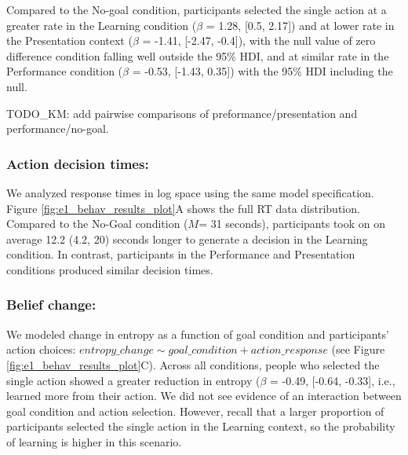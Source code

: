 \documentclass[10pt, letterpaper]{article}
\begin{document}
Compared to the No-goal condition, participants selected the single
action at a greater rate in the Learning condition (\(\beta\) = 1.28,
{[}0.5, 2.17{]}) and at lower rate in the Presentation context
(\(\beta\) = -1.41, {[}-2.47, -0.4{]}), with the null value of zero
difference condition falling well outside the 95\% HDI, and at similar
rate in the Performance condition (\(\beta\) = -0.53, {[}-1.43, 0.35{]})
with the 95\% HDI including the null.

TODO\_KM: add pairwise comparisons of preformance/presentation and
performance/no-goal.

\subsubsection{Action decision times:}\label{action-decision-times}

We analyzed response times in log space using the same model
specification. Figure \ref{fig:e1_behav_results_plot}A shows the full RT
data distribution. Compared to the No-Goal condition (\(M\)= 31
seconds), participants took on on average 12.2 (4.2, 20) seconds longer
to generate a decision in the Learning condition. In contrast,
participants in the Performance and Presentation conditions produced
similar decision times.

\subsubsection{Belief change:}\label{belief-change}

We modeled change in entropy as a function of goal condition and
participants' action choices:
\texttt{$entropy\_change \sim goal\_condition + action\_response$} (see
Figure \ref{fig:e1_behav_results_plot}C). Across all conditions, people
who selected the single action showed a greater reduction in entropy
(\(\beta\) = -0.49, {[}-0.64, -0.33{]}, i.e., learned more from their
action. We did not see evidence of an interaction between goal condition
and action selection. However, recall that a larger proportion of
participants selected the single action in the Learning context, so the
probability of learning is higher in this scenario.
\end{document}
